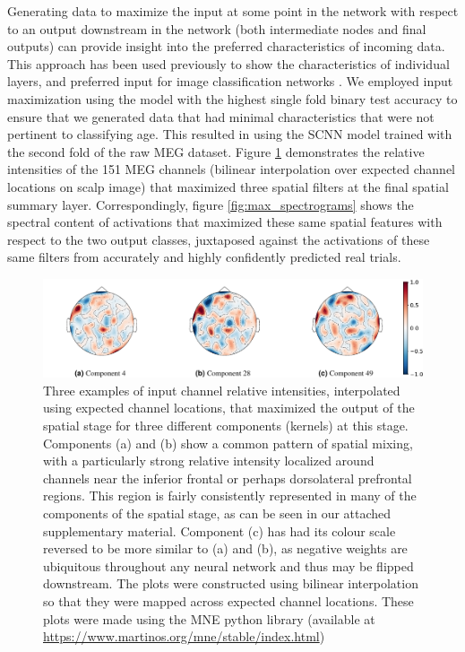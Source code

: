 \documentclass[fleqn,10pt]{wlscirep}
\begin{document}
Generating data to maximize the input at some point in the network with respect to an output downstream in the network (both intermediate nodes and final outputs) can provide insight into the preferred characteristics of incoming data. This approach has been used previously to show the characteristics of individual layers, and preferred input for image classification networks \cite{Yosinski2015}. We employed input maximization using the model with the highest single fold binary test accuracy to ensure that we generated data that had minimal characteristics that were not pertinent to classifying age. This resulted in using the SCNN model trained with the second fold of the raw MEG dataset. Figure \ref{fig:max_components} demonstrates the relative intensities of the 151 MEG channels (bilinear interpolation over expected channel locations on scalp image) that maximized three spatial filters at the final spatial summary layer. Correspondingly, figure \ref{fig:max_spectrograms} shows the spectral content of activations that maximized these same spatial features with respect to the two output classes, juxtaposed against the activations of these same filters from accurately and highly confidently predicted real trials.

\begin{figure}[h!]
  \centering\includegraphics[width=\linewidth]{components.pdf}
  \caption[textfind]{Three examples of input channel relative intensities, interpolated using expected channel locations, that maximized the output of the spatial stage for three different components (kernels) at this stage. Components (a) and (b) show a common pattern of spatial mixing, with a particularly strong relative intensity localized around channels near the inferior frontal or perhaps dorsolateral prefrontal regions. This region is fairly consistently represented in many of the components of the spatial stage, as can be seen in our attached supplementary material. Component (c) has had its colour scale reversed to be more similar to (a) and (b), as negative weights are ubiquitous throughout any neural network and thus may be flipped downstream. The plots were constructed using bilinear interpolation so that they were mapped across expected channel locations. These plots were made using the MNE python library (available at \url{https://www.martinos.org/mne/stable/index.html})}
  \label{fig:max_components}
\end{figure}
\end{document}

